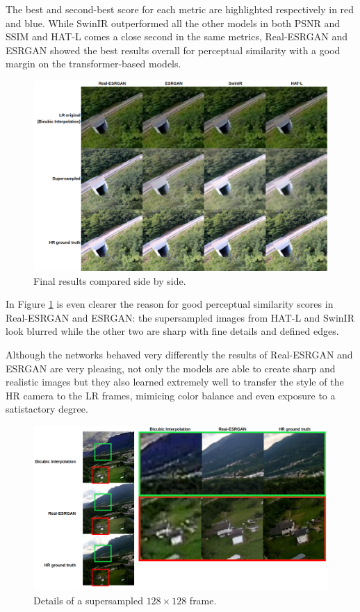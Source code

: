 The best and second-best score for each metric are highlighted respectively in red and blue. While SwinIR outperformed all the other models in both PSNR and SSIM and HAT-L comes a close second in the same metrics, Real-ESRGAN and ESRGAN showed the best results overall for perceptual similarity with a good margin on the transformer-based models.


\begin{figure}[H]

  \includegraphics[width=1\textwidth]{figures/results/comp_table.png}
  \caption{Final results compared side by side.}
  \label{img:comp_table}
\end{figure}

In Figure \ref{img:comp_table} is even clearer the reason for good perceptual similarity scores in Real-ESRGAN and ESRGAN: the supersampled images from HAT-L and SwinIR look blurred while the other two are sharp with fine details and defined edges.

Although the networks behaved very differently the results of Real-ESRGAN and ESRGAN are very pleasing, not only the models are able to create sharp and realistic images but they also learned extremely well to transfer the style of the HR camera to the LR frames, mimicing color balance and even exposure to a satistactory degree.

\begin{figure}[H]
  \includegraphics[width=1\textwidth]{figures/results/realesrgan128_example_table.png}
  \caption{Details of a supersampled \(128\times128\) frame.}
  \label{img:example_table}
\end{figure}

